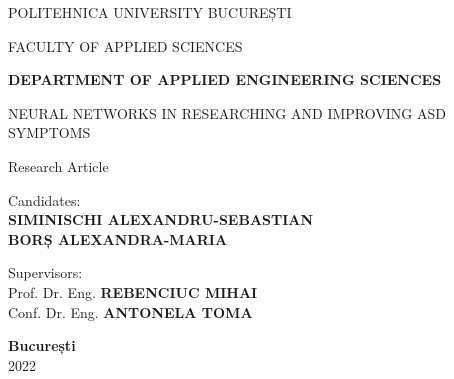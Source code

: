 \begin{titlepage}
    \begin{center}
        \Large
        \MakeUppercase{Politehnica University București}
        
        \Large
        \MakeUppercase{Faculty of Applied Sciences}
        
        \Large
        \textbf{\MakeUppercase{Department of Applied Engineering Sciences}}
        
        \vspace{1cm}
        
        \vspace{3cm}
        \LARGE
        \MakeUppercase{NEURAL NETWORKS IN RESEARCHING AND IMPROVING ASD SYMPTOMS}
        
        \vspace{0.5cm}
        \Large
        Research Article
        
        \vspace{3cm}
        \begin{flushright}
            Candidates:\\
            \textbf{\MakeUppercase{Siminischi Alexandru-Sebastian}}\\
            \textbf{\MakeUppercase{Borș Alexandra-Maria}}
        \end{flushright}
        \vspace{.5cm}
        \begin{flushleft}
        Supervisors:\\
        Prof. Dr. Eng. \textbf{\MakeUppercase{Rebenciuc Mihai}}\\
        Conf. Dr. Eng. \textbf{\MakeUppercase{Antonela Toma}}\\
        \end{flushleft}
        
        \vfill
        \Large
        \textbf{București\\}
        \Large
        2022
    \end{center}
\end{titlepage}